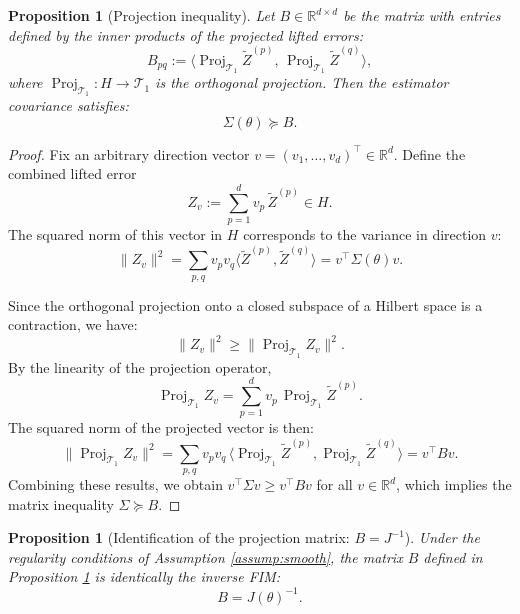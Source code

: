 \documentclass[pdflatex,sn-mathphys-num]{sn-jnl}%
\theoremstyle{thmstyleone}%
\newtheorem{proposition}[theorem]{Proposition}%
\theoremstyle{thmstyletwo}%
\theoremstyle{thmstylethree}%
\begin{document}
\begin{proposition}[Projection inequality]\label{prop:proj_ineq}
Let \(B\in\mathbb{R}^{d\times d}\) be the matrix with entries defined by the inner products of the projected lifted errors:
\[
B_{pq} := \big\langle \operatorname{Proj}_{\mathcal{T}_1}\widetilde Z^{(p)},\, \operatorname{Proj}_{\mathcal{T}_1}\widetilde Z^{(q)}\big\rangle,
\]
where \(\operatorname{Proj}_{\mathcal{T}_1}:H\to \mathcal{T}_1\) is the orthogonal projection. Then the estimator covariance satisfies:
\[
\Sigma(\theta) \succeq B.
\]
\end{proposition}

\begin{proof}
Fix an arbitrary direction vector \(v=(v_1,\dots,v_d)^\top\in\mathbb{R}^d\). Define the combined lifted error
\[
Z_v := \sum_{p=1}^d v_p\,\widetilde Z^{(p)} \in H.
\]
The squared norm of this vector in \(H\) corresponds to the variance in direction \(v\):
\[
\| Z_v \|^2 = \sum_{p,q} v_p v_q \langle \widetilde Z^{(p)}, \widetilde Z^{(q)} \rangle = v^\top\Sigma(\theta)v.
\]

Since the orthogonal projection onto a closed subspace of a Hilbert space is a contraction, we have:
\[
\|Z_v\|^2 \ge \big\| \operatorname{Proj}_{\mathcal{T}_1} Z_v\big\|^2.
\]
By the linearity of the projection operator,
\[
\operatorname{Proj}_{\mathcal{T}_1} Z_v = \sum_{p=1}^d v_p\,\operatorname{Proj}_{\mathcal{T}_1}\widetilde Z^{(p)}.
\]
The squared norm of the projected vector is then:
\[
\big\| \operatorname{Proj}_{\mathcal{T}_1} Z_v\big\|^2
= \sum_{p,q} v_p v_q\,\big\langle \operatorname{Proj}_{\mathcal{T}_1}\widetilde Z^{(p)},\operatorname{Proj}_{\mathcal{T}_1}\widetilde Z^{(q)}\big\rangle
= v^\top B v.
\]
Combining these results, we obtain \(v^\top\Sigma v \ge v^\top B v\) for all \(v\in\mathbb{R}^d\), which implies the matrix inequality \(\Sigma\succeq B\).
\end{proof}

\begin{proposition}[Identification of the projection matrix: $B=J^{-1}$]\label{prop:B_is_Jinv}
Under the regularity conditions of Assumption \ref{assump:smooth}, the matrix \(B\) defined in Proposition \ref{prop:proj_ineq} is identically the inverse FIM:
\[
B = J(\theta)^{-1}.
\]
\end{proposition}
\end{document}
